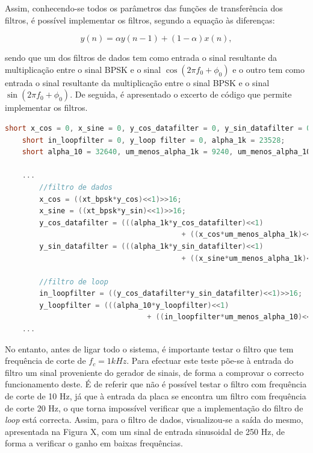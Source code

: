 \documentclass[11pt]{article}
\numberwithin{equation}{section}
\begin{document}
{Assim, conhecendo-se todos os parâmetros das funções de transferência dos filtros, é possível implementar os filtros, segundo a equação às diferenças:

\vspace{-3mm}
\begin{equation}
y(n) = \alpha y(n-1) +  (1-\alpha)x(n),
\end{equation} 

\vspace{1mm}
sendo que um dos filtros de dados tem como entrada o sinal resultante da multiplicação entre o sinal BPSK e o sinal $\cos(2\pi f_0 + \phi_0)$ e o outro tem como entrada o sinal resultante da multiplicação entre o sinal BPSK e o sinal $\sin(2\pi f_0 + \phi_0)$. De seguida, é apresentado o excerto de código que permite implementar os filtros. 

\begin{lstlisting}[language=C]
	short x_cos = 0, x_sine = 0, y_cos_datafilter = 0, y_sin_datafilter = 0;  
	short in_loopfilter = 0, y_loop filter = 0, alpha_1k = 23528; 
	short alpha_10 = 32640, um_menos_alpha_1k = 9240, um_menos_alpha_10 = 127;

	...
		//filtro de dados
		x_cos = ((xt_bpsk*y_cos)<<1)>>16;
		x_sine = ((xt_bpsk*y_sin)<<1)>>16;
		y_cos_datafilter = (((alpha_1k*y_cos_datafilter)<<1)
										 + ((x_cos*um_menos_alpha_1k)<<1))>>16;
		y_sin_datafilter = (((alpha_1k*y_sin_datafilter)<<1)
										 + ((x_sine*um_menos_alpha_1k)<<1))>>16;
	
		//filtro de loop
		in_loopfilter = ((y_cos_datafilter*y_sin_datafilter)<<1)>>16;
		y_loopfilter = (((alpha_10*y_loopfilter)<<1) 
								 + ((in_loopfilter*um_menos_alpha_10)<<1))>>16;
	...
\end{lstlisting}

No entanto, antes de ligar todo o sistema, é importante testar o filtro que tem frequência de corte de $f_c = 1 kHz$. Para efectuar este teste põe-se à entrada do filtro um sinal proveniente do gerador de sinais, de forma a comprovar o correcto funcionamento deste. É de referir que não é possível testar o filtro com frequência de corte de 10 Hz, já que à entrada da placa se encontra um filtro com frequência de corte 20 Hz, o que torna impossível verificar que a implementação do filtro de \textit{loop} está correcta. Assim, para o filtro de dados, visualizou-se a saída do mesmo, apresentada na Figura X, com um sinal de entrada sinusoidal de 250 Hz, de forma a verificar o ganho em baixas frequências.

}
\end{document}
